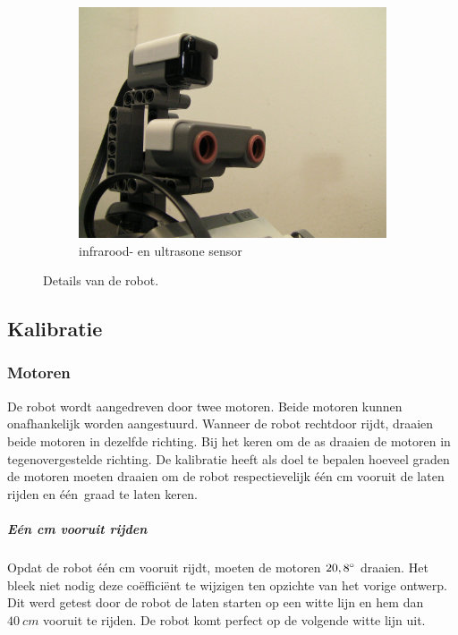 \documentclass[tt3]{penoverslag}
\begin{document}
\begin{figure}
\begin{subfigure}[h]{0.325\textwidth}
		\includegraphics[width=\textwidth]{robotSensoren}
		\caption{infrarood- en ultrasone sensor}
	\end{subfigure}
\caption{Details van de robot.}
\label{fig:robotDetail}
\end{figure}

\subsection{Kalibratie}
\label{ssec:Kalib}

\subsubsection{Motoren}
De robot wordt aangedreven door twee motoren. Beide motoren kunnen onafhankelijk worden aangestuurd. Wanneer de robot rechtdoor rijdt, draaien beide motoren in dezelfde richting. Bij het keren om de as draaien de motoren in tegenovergestelde richting. De kalibratie heeft als doel te bepalen hoeveel graden de motoren moeten draaien om de robot respectievelijk \'e\'en cm vooruit de laten rijden en \'e\'en~graad te laten keren.

\subparagraph{E\'en cm vooruit rijden}
Opdat de robot \'e\'en cm vooruit rijdt, moeten de motoren $20,8\degree$ draaien. Het bleek niet nodig deze co\"effici\"ent te wijzigen ten opzichte van het vorige ontwerp. Dit werd getest door de robot de laten starten op een witte lijn en hem dan $40~cm$ vooruit te rijden. De robot komt perfect op de volgende witte lijn uit.
\end{document}
